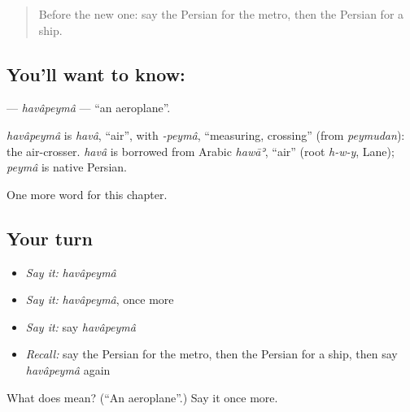 \begin{quote}
Before the new one: say the Persian for the metro, then the Persian for a ship.
\end{quote}

\subsection*{You'll want to know: }
\textbf{} — \emph{havâpeymâ} — \textquotedblleft{}an aeroplane\textquotedblright{}.

\begin{cousinweb}
\emph{havâpeymâ} is \emph{havâ}, \textquotedblleft{}air\textquotedblright{}, with \emph{-peymâ}, \textquotedblleft{}measuring, crossing\textquotedblright{} (from \emph{peymudan}): the air-crosser. \emph{havâ} is borrowed from Arabic \emph{hawāʾ}, \textquotedblleft{}air\textquotedblright{} (root \emph{h-w-y}, Lane); \emph{peymâ} is native Persian.
\end{cousinweb}

\begin{grammarlens}[title={What you've built}]
One more word for this chapter.
\end{grammarlens}

\subsection*{Your turn}
\begin{itemize}
\raggedright
  \item \emph{Say it:} \emph{havâpeymâ}
  \item \emph{Say it:} \emph{havâpeymâ}, once more
  \item \emph{Say it:} say \emph{havâpeymâ}
  \item \emph{Recall:} say the Persian for the metro, then the Persian for a ship, then say \emph{havâpeymâ} again
\end{itemize}

\begin{tcolorbox}[breakable,colback=teal!4,colframe=teal!35!black,title={Before you move on}]
What does  mean? (\textquotedblleft{}An aeroplane\textquotedblright{}.) Say it once more.
\end{tcolorbox}
